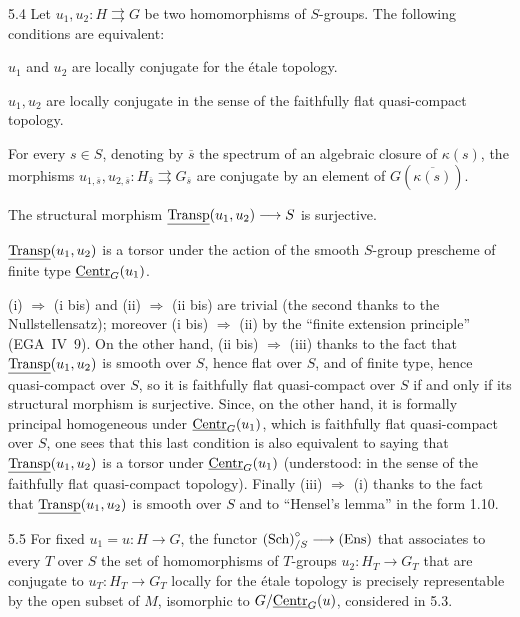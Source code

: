 \begin{corollary}{5.4}\label{XI.5.4}
Let $u_1,u_2:H\rightrightarrows G$ be two homomorphisms of $S$-groups. The following conditions are equivalent:
\begin{enumeratei}
\item $u_1$ and $u_2$ are locally conjugate for the étale topology.
\item[(i bis)] $u_1,u_2$ are locally conjugate in the sense of the faithfully flat quasi-compact topology.
\item For every $s\in S$, denoting by $\overline s$ the spectrum of an algebraic closure of $\kappa(s)$, the morphisms $u_{1,\overline s},u_{2,\overline s}:H_{\overline s}\rightrightarrows G_{\overline s}$ are conjugate by an element of $G(\overline{\kappa(s)})$.
\item[(ii bis)] The structural morphism $\underline{\operatorname{Transp}}(u_1,u_2)\longrightarrow S$ is surjective.
\item $\underline{\operatorname{Transp}}(u_1,u_2)$ is a torsor under the action of the smooth $S$-group prescheme of finite type $\underline{\mathrm{Centr}}_G(u_1)$.
\end{enumeratei}
\end{corollary}
(i) $\Rightarrow$ (i bis) and (ii) $\Rightarrow$ (ii bis) are trivial (the second thanks to the Nullstellensatz); moreover (i bis) $\Rightarrow$ (ii) by the ``finite extension principle'' (EGA~IV~9). On the other hand, (ii bis) $\Rightarrow$ (iii) thanks to the fact that $\underline{\operatorname{Transp}}(u_1,u_2)$ is smooth over $S$, hence flat over $S$, and of finite type, hence quasi-compact over $S$, so it is faithfully flat quasi-compact over $S$ if and only if its structural morphism is surjective. Since, on the other hand, it is formally principal homogeneous under $\underline{\mathrm{Centr}}_G(u_1)$, which is faithfully flat quasi-compact over $S$, one sees that this last condition is also equivalent to saying that $\underline{\operatorname{Transp}}(u_1,u_2)$ is a torsor under $\underline{\mathrm{Centr}}_G(u_1)$ (understood: in the sense of the faithfully flat quasi-compact topology). Finally (iii) $\Rightarrow$ (i) thanks to the fact that $\underline{\operatorname{Transp}}(u_1,u_2)$ is smooth over $S$ and to ``Hensel's lemma'' in the form 1.10.
\begin{remark}{5.5}\label{XI.5.5}
For fixed $u_1=u:H\to G$, the functor $\textup{(Sch)}^\circ_{/S}\longrightarrow\textup{(Ens)}$ that associates to every $T$ over $S$ the set of homomorphisms of $T$-groups $u_2:H_T\to G_T$ that are conjugate to $u_T:H_T\to G_T$ locally for the étale topology is precisely representable by the open subset of $M$, isomorphic to $G/\underline{\mathrm{Centr}}_G(u)$, considered in 5.3.
\end{remark}

